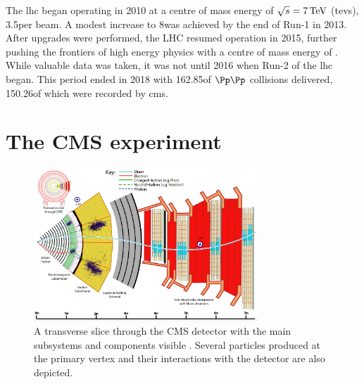 The \acrshort{lhc} began operating in 2010 at a centre of mass energy of $\sqrt{s} = \text{7}\,\text{Te\hspace{-.08em}V}$ (\acrlong{tev}s), 3.5\TeV per beam. A modest increase to 8\TeV was achieved by the end of Run-1 in 2013. After upgrades were performed, the LHC resumed operation in 2015, further pushing the frontiers of high energy physics with a centre of mass energy of \comruntwo. While valuable data was taken, it was not until 2016 when Run-2 of the \acrshort{lhc} began. This period ended in 2018 with 162.85\fbinv of $\Pp\Pp$ collisions delivered, 150.26\fbinv of which were recorded by \acrshort{cms}.


\section{The CMS experiment}
\label{sec:detector_cms}


\begin{figure}[htbp]
    \centering
    \includegraphics[width=0.75\textwidth]{figures/Transverse_slice_CMS.png}
    \caption[A transverse slice through the CMS detector with the main subsystems and components visible]{A transverse slice through the CMS detector with the main subsystems and components visible \cite{CMS-PRF-14-001}. Several particles produced at the primary vertex and their interactions with the detector are also depicted.}
    \label{fig:detector_cms_transverse}
\end{figure}

